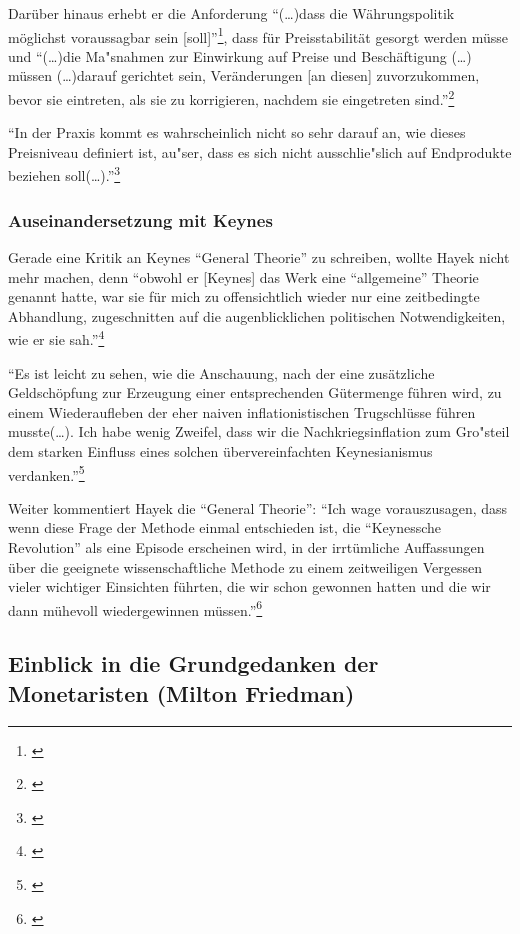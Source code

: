 \documentclass[
        onecolumn,
        a4paper,
        abstracton,
        parskip=half
        ,final
        ]{scrartcl}
\begin{document}
Dar{\"u}ber hinaus erhebt er die Anforderung "`(\ldots)dass die W{\"a}hrungspolitik m{\"o}glichst voraussagbar sein [soll]"'\footnote[423]{\citep*[S.420]{hayek1971}}, dass f{\"u}r Preisstabilit{\"a}t gesorgt werden m{\"u}sse und "`(\ldots)die Ma{"s}nahmen zur Einwirkung auf Preise und Besch{\"a}ftigung (\ldots) m{\"u}ssen (\ldots)darauf gerichtet sein, Ver{\"a}nderungen [an diesen] zuvorzukommen, bevor sie eintreten, als sie zu korrigieren, nachdem sie eingetreten sind."'\footnote[425]{\citep*[S.422]{hayek1971}}

"`In der Praxis kommt es wahrscheinlich nicht so sehr darauf an, wie dieses Preisniveau definiert ist, au{"s}er, dass es sich nicht ausschlie{"s}lich auf Endprodukte beziehen soll(\ldots)."'\footnote[426]{\citep*[S.423]{hayek1971}}

\subsubsection{Auseinandersetzung mit Keynes}

Gerade eine Kritik an Keynes "`General Theorie"' zu schreiben, wollte Hayek nicht mehr machen, denn "`obwohl er [Keynes] das Werk eine "`allgemeine"' Theorie genannt hatte, war sie f{\"u}r mich zu offensichtlich wieder nur eine zeitbedingte Abhandlung, zugeschnitten auf die augenblicklichen politischen Notwendigkeiten, wie er sie sah."'\footnote[427]{\citep*[S.91]{Hayek1969}}

"`Es ist leicht zu sehen, wie die Anschauung, nach der eine zus{\"a}tzliche Geldsch{\"o}pfung zur Erzeugung einer entsprechenden G{\"u}termenge f{\"u}hren wird, zu einem Wiederaufleben der eher naiven inflationistischen Trugschl{\"u}sse f{\"u}hren musste(\ldots). Ich habe wenig Zweifel, dass wir die Nachkriegsinflation zum Gro{"s}teil dem starken Einfluss eines solchen {\"u}bervereinfachten Keynesianismus verdanken."'\footnote[428]{\citep*[S.93]{Hayek1969}}

Weiter kommentiert Hayek die "`General Theorie"':
"`Ich wage vorauszusagen, dass wenn diese Frage der Methode einmal entschieden ist, die "`Keynessche Revolution"' als eine Episode erscheinen wird, in der irrt{\"u}mliche Auffassungen {\"u}ber die geeignete wissenschaftliche Methode zu einem zeitweiligen Vergessen vieler wichtiger Einsichten f{\"u}hrten, die wir schon gewonnen hatten und die wir dann m{\"u}hevoll wiedergewinnen m{\"u}ssen."'\footnote[429]{\citep*[S.96]{Hayek1969}}

\subsection{Einblick in die Grundgedanken der Monetaristen (Milton Friedman)} %
\end{document}
